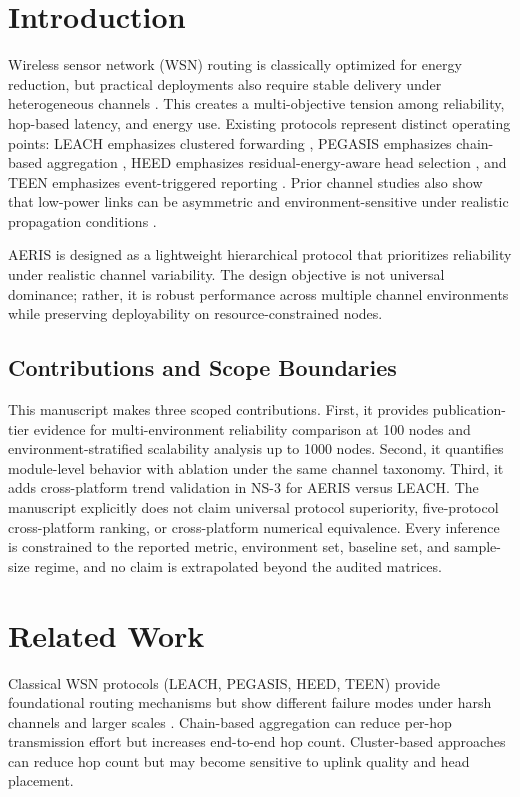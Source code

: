 \documentclass[sensors,article,submit,moreauthors,pdftex]{Definitions/mdpi}
\begin{document}
\section{Introduction}
Wireless sensor network (WSN) routing is classically optimized for energy reduction, but practical deployments also require stable delivery under heterogeneous channels \cite{Akyildiz2002Survey,Rault2016Energy,Kandris2020}. This creates a multi-objective tension among reliability, hop-based latency, and energy use. Existing protocols represent distinct operating points: LEACH emphasizes clustered forwarding \cite{Heinzelman2000LEACH}, PEGASIS emphasizes chain-based aggregation \cite{Lindsey2002PEGASIS}, HEED emphasizes residual-energy-aware head selection \cite{Younis2004HEED}, and TEEN emphasizes event-triggered reporting \cite{Manjeshwar2001TEEN}. Prior channel studies also show that low-power links can be asymmetric and environment-sensitive under realistic propagation conditions \cite{Zuniga2004,Zuniga2007Asymmetry,Baccour2012RLQE}.

AERIS is designed as a lightweight hierarchical protocol that prioritizes reliability under realistic channel variability. The design objective is not universal dominance; rather, it is robust performance across multiple channel environments while preserving deployability on resource-constrained nodes.

\subsection*{Contributions and Scope Boundaries}
This manuscript makes three scoped contributions. First, it provides publication-tier evidence for multi-environment reliability comparison at 100 nodes and environment-stratified scalability analysis up to 1000 nodes. Second, it quantifies module-level behavior with ablation under the same channel taxonomy. Third, it adds cross-platform trend validation in NS-3 for AERIS versus LEACH. The manuscript explicitly does not claim universal protocol superiority, five-protocol cross-platform ranking, or cross-platform numerical equivalence. Every inference is constrained to the reported metric, environment set, baseline set, and sample-size regime, and no claim is extrapolated beyond the audited matrices.

\section{Related Work}
Classical WSN protocols (LEACH, PEGASIS, HEED, TEEN) provide foundational routing mechanisms but show different failure modes under harsh channels and larger scales \cite{Heinzelman2002LEACH,Lindsey2002PEGASIS,Younis2004HEED,Kandris2020}. Chain-based aggregation can reduce per-hop transmission effort but increases end-to-end hop count. Cluster-based approaches can reduce hop count but may become sensitive to uplink quality and head placement.
\end{document}

